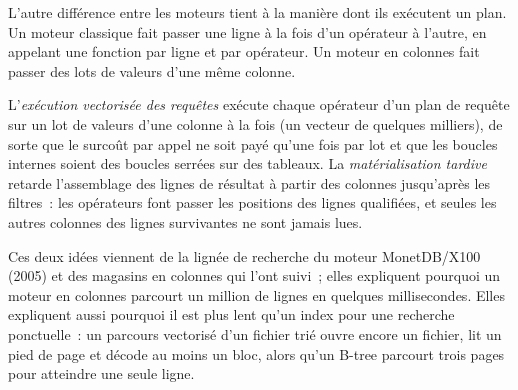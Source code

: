 L'autre différence entre les moteurs tient à la manière dont ils exécutent un plan. Un moteur classique fait passer une ligne à la fois d'un opérateur à
l'autre, en appelant une fonction par ligne et par opérateur. Un moteur en colonnes fait passer des lots de valeurs d'une même colonne.

\begin{definition}\label{def:pl:time-series-databases-and-the-alternatives:vectorised}
L'\emph{exécution vectorisée des requêtes} exécute chaque opérateur d'un plan de requête sur un lot de valeurs
d'une colonne à la fois (un vecteur de quelques milliers), de sorte que le surcoût par appel ne soit payé qu'une fois par lot et que les boucles internes soient des boucles serrées
sur des tableaux. La \emph{matérialisation tardive} retarde l'assemblage des lignes de résultat à partir des colonnes
jusqu'après les filtres~: les opérateurs font passer les positions des lignes qualifiées, et seules les autres colonnes des lignes survivantes ne sont jamais lues.
\end{definition}

Ces deux idées viennent de la lignée de recherche du moteur MonetDB/X100 (2005) et des magasins en colonnes qui l'ont suivi~; elles expliquent pourquoi un
moteur en colonnes parcourt un million de lignes en quelques millisecondes. Elles expliquent aussi pourquoi il est plus lent qu'un index pour une recherche ponctuelle~: un
parcours vectorisé d'un fichier trié ouvre encore un fichier, lit un pied de page et décode au moins un bloc, alors qu'un B-tree parcourt trois
pages pour atteindre une seule ligne.

\begin{omfigure}

\label{fig:pl:time-series-databases-and-the-alternatives:vector}
\end{omfigure}

